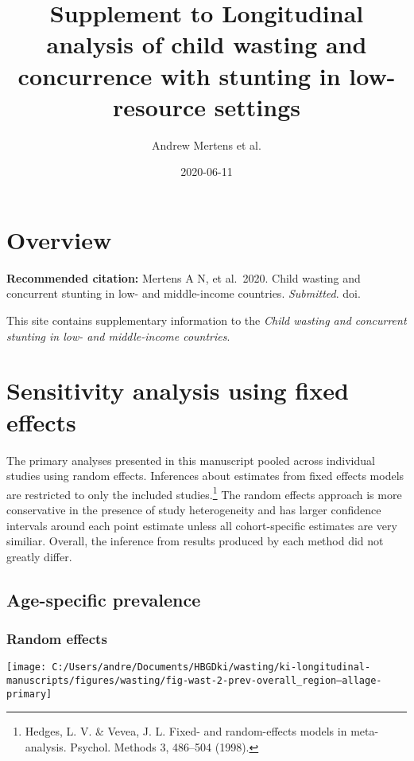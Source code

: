 \documentclass[
  9pt,
]{book}
\title{Supplement to Longitudinal analysis of child wasting and concurrence with stunting in low-resource settings}
\author{Andrew Mertens et al.}
\date{2020-06-11}
\begin{document}
\maketitle

{
\setcounter{tocdepth}{1}
\tableofcontents
}
\hypertarget{overview}{%
\chapter{Overview}\label{overview}}

\textbf{Recommended citation:} Mertens A N, et al.~2020. Child wasting and concurrent stunting in low- and middle-income countries. \emph{Submitted}. doi.

This site contains supplementary information to the \emph{Child wasting and concurrent stunting in low- and middle-income countries}.

\hypertarget{fixed-effects}{%
\chapter{Sensitivity analysis using fixed effects}\label{fixed-effects}}

\raggedright

The primary analyses presented in this manuscript pooled across individual studies using random effects. Inferences about estimates from fixed effects models are restricted to only the included studies.\footnote{Hedges, L. V. \& Vevea, J. L. Fixed- and random-effects models in meta-analysis. Psychol. Methods 3, 486--504 (1998).} The random effects approach is more conservative in the presence of study heterogeneity and has larger confidence intervals around each point estimate unless all cohort-specific estimates are very similiar. Overall, the inference from results produced by each method did not greatly differ.

\hypertarget{age-specific-prevalence}{%
\section{Age-specific prevalence}\label{age-specific-prevalence}}

\hypertarget{random-effects}{%
\subsection{Random effects}\label{random-effects}}

\texttt{[image: C:/Users/andre/Documents/HBGDki/wasting/ki-longitudinal-manuscripts/figures/wasting/fig-wast-2-prev-overall\_region--allage-primary]}
\end{document}
